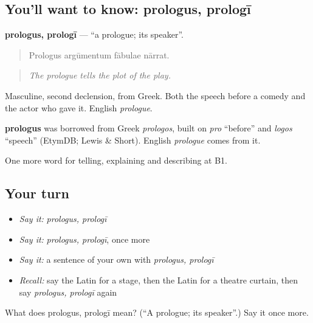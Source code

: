 \subsection*{You'll want to know: prologus, prologī}
\textbf{prologus, prologī} — \textquotedblleft{}a prologue; its speaker\textquotedblright{}.

\begin{quote}
Prologus argūmentum fābulae nārrat.
\end{quote}

\begin{quote}
\emph{The prologue tells the plot of the play.}
\end{quote}

Masculine, second declension, from Greek. Both the speech before a comedy and the actor who gave it. English \emph{prologue}.

\begin{cousinweb}
\textbf{prologus} was borrowed from Greek \emph{prologos}, built on \emph{pro} \textquotedblleft{}before\textquotedblright{} and \emph{logos} \textquotedblleft{}speech\textquotedblright{} (EtymDB; Lewis \& Short). English \emph{prologue} comes from it.
\end{cousinweb}

\begin{grammarlens}[title={What you've built}]
One more word for telling, explaining and describing at B1.
\end{grammarlens}

\subsection*{Your turn}
\begin{itemize}
\raggedright
  \item \emph{Say it:} \emph{prologus, prologī}
  \item \emph{Say it:} \emph{prologus, prologī}, once more
  \item \emph{Say it:} a sentence of your own with \emph{prologus, prologī}
  \item \emph{Recall:} say the Latin for a stage, then the Latin for a theatre curtain, then say \emph{prologus, prologī} again
\end{itemize}

\begin{tcolorbox}[breakable,colback=teal!4,colframe=teal!35!black,title={Before you move on}]
What does prologus, prologī mean? (\textquotedblleft{}A prologue; its speaker\textquotedblright{}.) Say it once more.
\end{tcolorbox}
